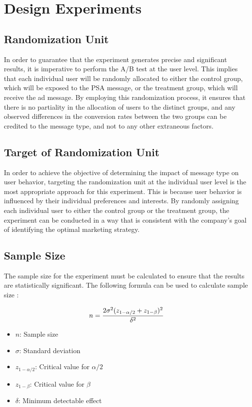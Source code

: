 \documentclass{article}
\begin{document}
\section{Design Experiments} 

\subsection*{Randomization Unit} 
In order to guarantee that the experiment generates precise and significant results, it is imperative to perform the A/B test at the user level. This implies that each individual user will be randomly allocated to either the control group, which will be exposed to the PSA message, or the treatment group, which will receive the ad message. By employing this randomization process, it ensures that there is no partiality in the allocation of users to the distinct groups, and any observed differences in the conversion rates between the two groups can be credited to the message type, and not to any other extraneous factors. 

\subsection*{Target of Randomization Unit} 

In order to achieve the objective of determining the impact of message type on user behavior, targeting the randomization unit at the individual user level is the most appropriate approach for this experiment. This is because user behavior is influenced by their individual preferences and interests. By randomly assigning each individual user to either the control group or the treatment group, the experiment can be conducted in a way that is consistent with the company's goal of identifying the optimal marketing strategy. 

\subsection*{Sample Size} 

The sample size for the experiment must be calculated to ensure that the results are statistically significant. The following formula can be used to calculate sample size \cite{kohavi_tang_xu_2020}:

$$
n = \cfrac{2 \sigma^2 (z_{1-\alpha/2}+z_{1-\beta})^2}{\delta^2}
$$

\begin{itemize}
    \item $n$: Sample size
    \item $\sigma$: Standard deviation
    \item $z_{1-\alpha/2}$: Critical value for $\alpha/2$
    \item $z_{1-\beta}$: Critical value for $\beta$
    \item $\delta$: Minimum detectable effect
\end{itemize}
\end{document}
